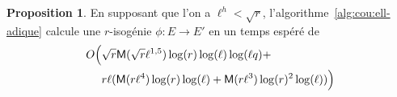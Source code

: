 \documentclass[10pt,a4paper]{book}
\theoremstyle{plain}
\theoremstyle{definition}
\theoremstyle{definition}
\theoremstyle{definition}
\theoremstyle{definition}
\newtheorem{prop}[thm]{Proposition}
\theoremstyle{definition}
\theoremstyle{remark}
\theoremstyle{remark}
\theoremstyle{definition}
\begin{document}
\begin{prop}
  \label{pro:full-complexity}
  En supposant que l'on a $\ell^h<\sqrt{r}$, 
  l'algorithme~\ref{alg:cou:ell-adique} calcule une $r$-isogénie 
  ${\phi:E \rightarrow E'}$ en un temps espéré de 
 \begin{equation*}
 \begin{alignedat}{1}
O\Bigl( & \sqrt{r}\mathsf{M}(\sqrt{r}\ell^{1,5})\log(r)\log(\ell)\log(\ell q) + \\ 
& r \ell ( \mathsf{M}(r \ell^4) \log(r) \log(\ell) + \mathsf{M}(r \ell^3) \log(r)^2 \log(\ell) )  \Bigr)
 \end{alignedat}
 \end{equation*}
\end{prop}
\end{document}
